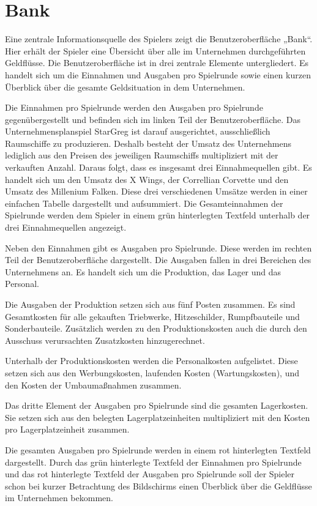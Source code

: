 \section{Bank}
\label{sec:ui-bank}

Eine zentrale Informationsquelle des Spielers zeigt die Benutzeroberfläche „Bank“. Hier erhält der Spieler eine Übersicht über alle im Unternehmen durchgeführten Geldflüsse. Die Benutzeroberfläche ist in drei zentrale Elemente untergliedert. Es handelt sich um die Einnahmen und Ausgaben pro Spielrunde sowie einen kurzen Überblick über die gesamte Geldsituation in dem Unternehmen.
 
Die Einnahmen pro Spielrunde werden den Ausgaben pro Spielrunde gegenübergestellt und befinden sich im linken Teil der Benutzeroberfläche. Das Unternehmensplanspiel StarGreg ist darauf ausgerichtet, ausschließlich Raumschiffe zu produzieren. Deshalb besteht der Umsatz des Unternehmens lediglich aus den Preisen des jeweiligen Raumschiffs multipliziert mit der verkauften Anzahl. Daraus folgt, dass es insgesamt drei Einnahmequellen gibt. Es handelt sich um den Umsatz des X Wings, der Correllian Corvette und den Umsatz des Millenium Falken. Diese drei verschiedenen Umsätze werden in einer einfachen Tabelle dargestellt und aufsummiert. Die Gesamteinnahmen der Spielrunde werden dem Spieler in einem grün hinterlegten Textfeld unterhalb der drei Einnahmequellen angezeigt.
 
Neben den Einnahmen gibt es Ausgaben pro Spielrunde. Diese werden im rechten Teil der Benutzeroberfläche dargestellt. Die Ausgaben fallen in drei Bereichen des Unternehmens an. Es handelt sich um die Produktion, das Lager und das Personal.
 
Die Ausgaben der Produktion setzen sich aus fünf Posten zusammen. Es sind Gesamtkosten für alle gekauften Triebwerke, Hitzeschilder, Rumpfbauteile und Sonderbauteile. Zusätzlich werden zu den Produktionskosten auch die durch den Ausschuss verursachten  Zusatzkosten hinzugerechnet.
 
Unterhalb der Produktionskosten werden die Personalkosten aufgelistet. Diese setzen sich aus den Werbungskosten, laufenden Kosten (Wartungskosten), und den Kosten der Umbaumaßnahmen zusammen.
 
Das dritte Element der Ausgaben pro Spielrunde sind die gesamten Lagerkosten. Sie setzen sich aus den belegten Lagerplatzeinheiten multipliziert mit den Kosten pro Lagerplatzeinheit zusammen.
 
Die gesamten Ausgaben pro Spielrunde werden in einem rot hinterlegten Textfeld dargestellt. Durch das grün hinterlegte Textfeld der Einnahmen pro Spielrunde und das rot hinterlegte Textfeld der Ausgaben pro Spielrunde soll der Spieler schon bei kurzer Betrachtung des Bildschirms einen Überblick über die Geldflüsse im Unternehmen bekommen.
  
